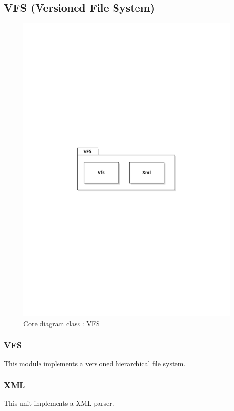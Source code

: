 	\subsection{VFS (Versioned File System)}
		\begin{figure}[ht]
			\begin{center}
				\includegraphics[width=\textwidth,  trim=2cm 12cm 2cm 12cm]{UML_figure/DC/core/vfs/DC_VFS.pdf}
				\caption{Core diagram class : VFS}
			\end{center}
		\end{figure}
		\subsubsection{VFS}
			This module implements a versioned hierarchical file system.
		\subsubsection{XML}
			This unit implements a XML parser.
\newpage
